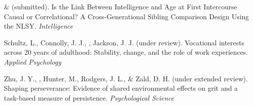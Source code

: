 \begin{etaremune}
\item\meb \& \Joe (submitted). Is the Link Between Intelligence and Age at First Intercourse Causal or Correlational? A Cross-Generational Sibling Comparison Design Using the NLSY. \textit{Intelligence}
\item Schultz, L., Connolly, J. J., \meb, Jackson, J. J. (under review). Vocational interests across 20 years of adulthood: Stability, change, and the role of work experiences. \textit{Applied Psychology}
\item Zhu, J. Y., \meb, Hunter, M., Rodgers, J. L., \& Zald, D. H. (under extended review). Shaping perseverance: Evidence of shared environmental effects on grit and a task-based measure of persistence. \textit{Psychological Science}
\end{etaremune}